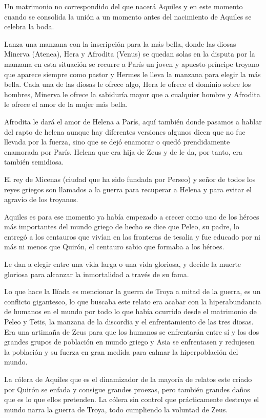 Un matrimonio no correspondido del que nacerá Aquiles y en este momento cuando se consolida la unión a un momento antes del nacimiento de Aquiles se celebra la boda.

Lanza una manzana con la inscripción para la más bella, donde las diosas Minerva (Atenea), Hera y Afrodita (Venus) se quedan solas en la disputa por la manzana en esta situación se recurre a París un joven y apuesto príncipe troyano que aparece siempre como pastor y Hermes le lleva la manzana para elegir la más bella. Cada una de las diosas le ofrece algo, Hera le ofrece el dominio sobre los hombres, Minerva le ofrece la sabiduría mayor que a cualquier hombre y Afrodita le ofrece el amor de la mujer más bella.

Afrodita le dará el amor de Helena a París, aquí también donde pasamos a hablar del rapto de helena aunque hay diferentes versiones algunos dicen que no fue llevada por la fuerza, sino que se dejó enamorar o quedó prendidamente enamorada por París. Helena que era hija de Zeus y de le da, por tanto, era también semidiosa. 

El rey de Micenas (ciudad que ha sido fundada por Perseo) y señor de todos los reyes griegos son llamados a la guerra para recuperar a Helena y para evitar el agravio de los troyanos.

Aquiles es para ese momento ya había empezado a crecer como uno de los héroes más importantes del mundo griego de hecho se dice que Peleo, su padre, lo entregó a los centauros que vivían en las fronteras de tesalia y fue educado por ni más ni menos que Quirón, el centauro sabio que formaba a los héroes.

Le dan a elegir entre una vida larga o una vida gloriosa, y decide la muerte gloriosa para alcanzar la inmortalidad a través de su fama.

Lo que hace la Ilíada es mencionar la guerra de Troya a mitad de la guerra, es un conflicto gigantesco, lo que buscaba este relato era acabar con la hiperabundancia de humanos en el mundo por todo lo que había ocurrido desde el matrimonio de Peleo y Tetis, la manzana de la discordia y el enfrentamiento de las tres diosas. Era una artimaña de Zeus para que los humanos se enfrentarán entre sí y los dos grandes grupos de población en mundo griego y Asia se enfrentasen y redujesen la población y su fuerza en gran medida para calmar la hiperpoblación del mundo.

La cólera de Aquiles que es el dinamizador de la mayoría de relatos este criado por Quirón se enfada y consigue grandes proezas, pero también grandes daños que es lo que ellos pretenden. La cólera sin control que prácticamente destruye el mundo narra la guerra de Troya, todo cumpliendo la voluntad de Zeus.

